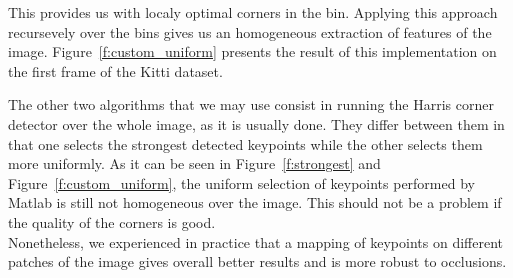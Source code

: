 This provides us with localy optimal corners in
the bin. Applying this approach recursevely over the bins gives us an homogeneous extraction of features of the image. Figure~\ref{f:custom_uniform} 
presents the result of this implementation on the first frame of the Kitti dataset.

The other two algorithms that we may use consist in running the Harris corner detector over the whole image, as it is usually done. They differ between them in that one selects the strongest detected keypoints while the other selects them more uniformly. As it can be seen in Figure~\ref{f:strongest} and Figure~\ref{f:custom_uniform}, the uniform selection of keypoints performed by Matlab is still not homogeneous over the image.
This should not be a problem if the quality of the corners is good. \\ Nonetheless, we experienced in practice that a mapping of keypoints on different
patches of the image gives overall better results and is more robust to occlusions.